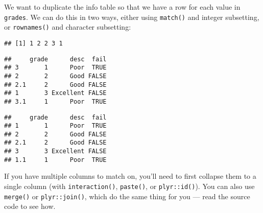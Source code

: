 We want to duplicate the info table so that we have a row for each value
in \texttt{grades}. We can do this in two ways, either using
\texttt{match()} and integer subsetting, or \texttt{rownames()} and
character subsetting: 

\begin{Shaded}
\begin{Highlighting}[]
\end{Highlighting}
\end{Shaded}

\begin{verbatim}
## [1] 1 2 2 3 1
\end{verbatim}

\begin{Shaded}
\begin{Highlighting}[]
\StringTok{ }\OperatorTok{$}
\end{Highlighting}
\end{Shaded}

\begin{verbatim}
##     grade      desc  fail
## 3       1      Poor  TRUE
## 2       2      Good FALSE
## 2.1     2      Good FALSE
## 1       3 Excellent FALSE
## 3.1     1      Poor  TRUE
\end{verbatim}

\begin{Shaded}
\begin{Highlighting}[]
\StringTok{ }\OperatorTok{$}
\NormalTok{info[}\NormalTok{(grades), ]}
\end{Highlighting}
\end{Shaded}

\begin{verbatim}
##     grade      desc  fail
## 1       1      Poor  TRUE
## 2       2      Good FALSE
## 2.1     2      Good FALSE
## 3       3 Excellent FALSE
## 1.1     1      Poor  TRUE
\end{verbatim}

If you have multiple columns to match on, you'll need to first collapse
them to a single column (with \texttt{interaction()}, \texttt{paste()},
or \texttt{plyr::id()}). You can also use \texttt{merge()} or
\texttt{plyr::join()}, which do the same thing for you --- read the
source code to see how. 

